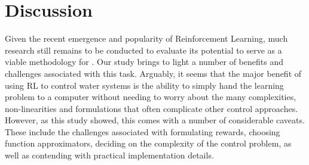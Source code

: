 \section{Discussion}

Given the recent emergence and popularity of Reinforcement Learning, much research still remains to be conducted to evaluate its potential to serve as a viable methodology for  .
Our study brings to light a number of benefits and challenges associated with this task.
Arguably, it seems that the major benefit of using RL to control water systems is the ability to simply hand the learning problem to a computer without needing to worry about the many complexities, non-linearities and formulations that often complicate other control approaches.
However, as this study showed, this comes with a number of considerable caveats.
These include the challenges associated with formulating rewards, choosing function approximators, deciding on the complexity of the control problem, as well as contending with practical implementation details.

